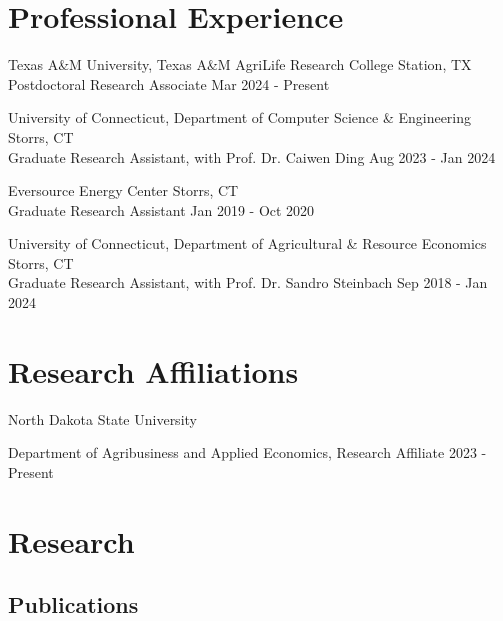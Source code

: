 \documentclass[10.5 pt,letterpaper]{article}
\renewenvironment{itemize}{
	\begin{list}{}{
			\setlength{\leftmargin}{1.5em}
		}
	}{
	\end{list}
}
\begin{document}
 \section*{\textbf{ Professional Experience}}
 \begin{itemize}
 	\item[-]  Texas A\&M University, Texas A\&M AgriLife Research  \hfill College Station, TX \\
 	Postdoctoral Research Associate   \hfill  Mar  2024  - Present
 	
 	  
 	
 	\item[-]    University of Connecticut, Department of Computer Science \& Engineering \hfill   Storrs, CT   \\  Graduate Research Assistant, with Prof. Dr. Caiwen Ding  \hfill    Aug 2023 - Jan 2024 
 	  
 	
 	\item[-]  Eversource Energy Center \hfill Storrs, CT   \\ 
 	Graduate Research Assistant   \hfill    Jan 2019 - Oct 2020
 	
 	
  	\item[-]    University of Connecticut, Department of Agricultural \& Resource Economics \hfill   Storrs, CT   \\  Graduate Research Assistant, with Prof. Dr. Sandro Steinbach  \hfill      Sep 2018 - Jan 2024
 

 
 
 \end{itemize}
 
 
	\section*{\textbf{Research  Affiliations}}
	
 
		North Dakota State University 
	\begin{itemize}
		\item[-] Department of Agribusiness and Applied Economics, Research Affiliate	\hfill    2023 - Present
	\end{itemize}
 
	 
 
	
	\section*{\textbf{Research}}
	
		\subsection*{\textbf{Publications}}
		
\end{document}
